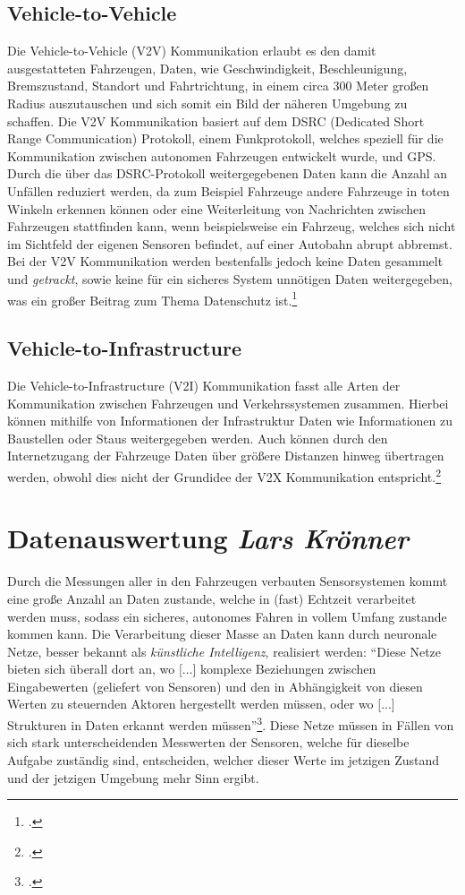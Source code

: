 \documentclass[a4paper, 12pt, openany]{book}
\newcommand\Section[2]{\section[#1 {\scriptsize\itshape#2}]{#1 \footnotesize\itshape#2}}
\begin{document}
            \subsection{Vehicle-to-Vehicle} \label{V2V}
                Die Vehicle-to-Vehicle (V2V) Kommunikation erlaubt es den damit ausgestatteten Fahrzeugen, Daten, wie Geschwindigkeit, Beschleunigung, Bremszustand, Standort und Fahrtrichtung, in einem circa 300 Meter großen Radius auszutauschen und sich somit ein Bild der näheren Umgebung zu schaffen.
                Die V2V Kommunikation basiert auf dem DSRC (Dedicated Short Range Communication) Protokoll, einem Funkprotokoll, welches speziell für die Kommunikation zwischen autonomen Fahrzeugen entwickelt wurde, und GPS.
                Durch die über das DSRC-Protokoll weitergegebenen Daten kann die Anzahl an Unfällen reduziert werden, da zum Beispiel Fahrzeuge andere Fahrzeuge in toten Winkeln erkennen können oder eine Weiterleitung von Nachrichten zwischen Fahrzeugen stattfinden kann, wenn beispielsweise ein Fahrzeug, welches sich nicht im Sichtfeld der eigenen Sensoren befindet, auf einer Autobahn abrupt abbremst.
                Bei der V2V Kommunikation werden bestenfalls jedoch keine Daten gesammelt und \textit{getrackt}, sowie keine für ein sicheres System unnötigen Daten weitergegeben, was ein großer Beitrag zum Thema Datenschutz ist.\footcite{nhtsav2v}
                
            \subsection{Vehicle-to-Infrastructure} \label{V2I}
                Die Vehicle-to-Infrastructure (V2I) Kommunikation fasst alle Arten der Kommunikation zwischen Fahrzeugen und Verkehrssystemen zusammen. Hierbei können mithilfe von Informationen der Infrastruktur Daten wie Informationen zu Baustellen oder Staus weitergegeben werden. Auch können durch den Internetzugang der Fahrzeuge Daten über größere Distanzen hinweg übertragen werden, obwohl dies nicht der Grundidee der V2X Kommunikation entspricht.\footcite[1--15]{schmidt2008v2x}
    
        \Section{Datenauswertung}{Lars Krönner} \label{dv}
            Durch die Messungen aller in den Fahrzeugen verbauten Sensorsystemen kommt eine große Anzahl an Daten zustande, welche in (fast) Echtzeit verarbeitet werden muss, sodass ein sicheres, autonomes Fahren in vollem Umfang zustande kommen kann.
            Die Verarbeitung dieser Masse an Daten kann durch neuronale Netze, besser bekannt als \textit{künstliche Intelligenz}, realisiert werden:
            \enquote{Diese Netze bieten sich überall dort an, wo [...] komplexe Beziehungen zwischen Eingabewerten (geliefert von Sensoren) und den in Abhängigkeit von diesen Werten zu steuernden Aktoren hergestellt werden müssen, oder wo [...] Strukturen in Daten erkannt werden müssen}\footcite[74]{robotik}.
            Diese Netze müssen in Fällen von sich stark unterscheidenden Messwerten der Sensoren, welche für dieselbe Aufgabe zuständig sind, entscheiden, welcher dieser Werte im jetzigen Zustand und der jetzigen Umgebung mehr Sinn ergibt. %
        
\end{document}
